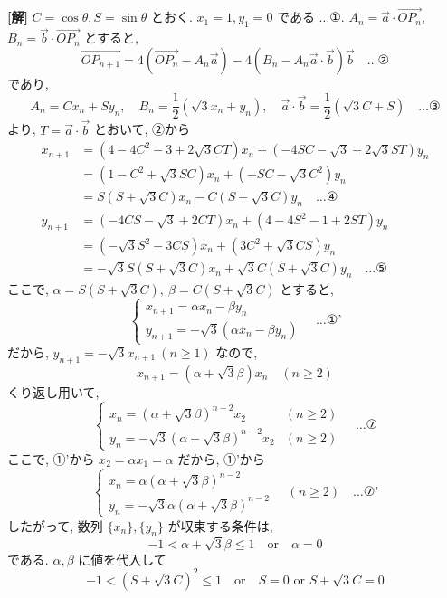 \documentclass[../main.tex]{subfiles}
\begin{document}
\noindent
\textbf{[解]} $C = \cos\theta, S = \sin\theta$ とおく. $x_1 = 1, y_1 = 0$ である $\dots \text{①}$. $A_n = \vec{a} \cdot \vec{OP_n}$, $B_n = \vec{b} \cdot \vec{OP_n}$ とすると,
\[
  \vec{OP_{n+1}} = 4(\vec{OP_n} - A_n \vec{a}) - 4(B_n - A_n \vec{a} \cdot \vec{b}) \vec{b} \quad \dots \text{②}
\]
であり,
\[
  A_n = C x_n + S y_n, \quad B_n = \frac{1}{2}(\sqrt{3} x_n + y_n), \quad \vec{a} \cdot \vec{b} = \frac{1}{2}(\sqrt{3} C + S) \quad \dots \text{③}
\]
より, $T = \vec{a} \cdot \vec{b}$ とおいて, ②から
\begin{align*}
  x_{n+1} &= (4 - 4C^2 - 3 + 2\sqrt{3}CT) x_n + (-4SC - \sqrt{3} + 2\sqrt{3}ST) y_n \\
  &= (1 - C^2 + \sqrt{3}SC) x_n + (-SC - \sqrt{3}C^2) y_n \\
  &= S(S + \sqrt{3}C) x_n - C(S + \sqrt{3}C) y_n \quad \dots \text{④} \\
  y_{n+1} &= (-4CS - \sqrt{3} + 2CT) x_n + (4 - 4S^2 - 1 + 2ST) y_n \\
  &= (-\sqrt{3}S^2 - 3CS) x_n + (3C^2 + \sqrt{3}CS) y_n \\
  &= -\sqrt{3} S(S + \sqrt{3}C) x_n + \sqrt{3} C(S + \sqrt{3}C) y_n \quad \dots \text{⑤}
\end{align*}
ここで, $\alpha = S(S + \sqrt{3}C), \ \beta = C(S + \sqrt{3}C)$ とすると,
\[
  \begin{cases}
    x_{n+1} = \alpha x_n - \beta y_n \\
    y_{n+1} = -\sqrt{3} (\alpha x_n - \beta y_n)
  \end{cases}
  \quad \dots \text{①'}
\]
だから, $y_{n+1} = -\sqrt{3} x_{n+1} \ (n \ge 1)$ なので,
\[
  x_{n+1} = (\alpha + \sqrt{3}\beta) x_n \quad (n \ge 2)
\]
くり返し用いて,
\[
  \begin{cases}
    x_n = (\alpha + \sqrt{3}\beta)^{n-2} x_2 & (n \ge 2) \\
    y_n = -\sqrt{3} (\alpha + \sqrt{3}\beta)^{n-2} x_2 & (n \ge 2)
  \end{cases}
  \quad \dots \text{⑦}
\]
ここで, ①'から $x_2 = \alpha x_1 = \alpha$ だから, ①'から
\[
  \begin{cases}
    x_n = \alpha (\alpha + \sqrt{3}\beta)^{n-2} \\
    y_n = -\sqrt{3}\alpha (\alpha + \sqrt{3}\beta)^{n-2}
  \end{cases}
  \quad (n \ge 2) \quad \dots \text{⑦'}
\]
したがって, 数列 $\{x_n\}, \{y_n\}$ が収束する条件は,
\[
  -1 < \alpha + \sqrt{3}\beta \le 1 \quad \text{or} \quad \alpha = 0
\]
である. $\alpha, \beta$ に値を代入して
\[
  -1 < (S + \sqrt{3}C)^2 \le 1 \quad \text{or} \quad S = 0 \text{ or } S + \sqrt{3}C = 0
\]
\end{document}
